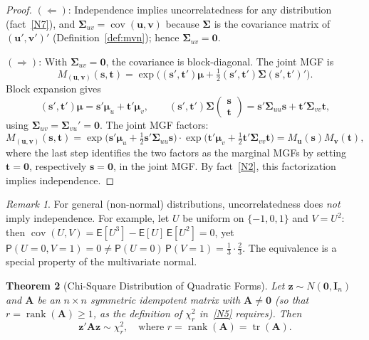 \documentclass[14pt]{extarticle}
\theoremstyle{plain}
\newtheorem{theorem}{Theorem}[section]
\theoremstyle{definition}
\theoremstyle{remark}
\newtheorem{remark}[theorem]{Remark}
\newcommand\expc{\mathsf{E}}
\newcommand\prb{\mathsf{P}}
\DeclareMathOperator\cov{cov}
\DeclareMathOperator\tr{tr}
\DeclareMathOperator\rank{rank}
\newcommand{\bI}{\mathbf{I}}
\newcommand{\bzero}{\mathbf{0}}
\newcommand{\bz}{\mathbf{z}}
\newcommand{\bA}{\mathbf{A}}
\newcommand{\bv}{\mathbf{v}}
\newcommand{\bu}{\mathbf{u}}
\begin{document}
\begin{proof}
$(\Leftarrow)$: Independence implies uncorrelatedness for any distribution (fact~\ref{N7}), and $\boldsymbol\Sigma_{uv} = \cov(\bu, \bv)$ because $\boldsymbol\Sigma$ is the covariance matrix of $(\bu', \bv')'$ (Definition~\ref{def:mvn}); hence $\boldsymbol\Sigma_{uv} = \bzero$.

$(\Rightarrow)$: With $\boldsymbol\Sigma_{uv} = \bzero$, the covariance is block-diagonal. The joint MGF is
\[
M_{(\bu,\bv)}(\mathbf{s}, \mathbf{t}) = \exp\bigl((\mathbf{s}', \mathbf{t}')\boldsymbol\mu + \tfrac{1}{2}(\mathbf{s}', \mathbf{t}')\boldsymbol\Sigma(\mathbf{s}', \mathbf{t}')'\bigr).
\]
Block expansion gives
\[
(\mathbf{s}', \mathbf{t}')\boldsymbol\mu = \mathbf{s}'\boldsymbol\mu_u + \mathbf{t}'\boldsymbol\mu_v, \qquad (\mathbf{s}', \mathbf{t}')\boldsymbol\Sigma\begin{pmatrix}\mathbf{s}\\\mathbf{t}\end{pmatrix} = \mathbf{s}'\boldsymbol\Sigma_{uu}\mathbf{s} + \mathbf{t}'\boldsymbol\Sigma_{vv}\mathbf{t},
\]
using $\boldsymbol\Sigma_{uv} = \boldsymbol\Sigma_{vu}' = \bzero$. The joint MGF factors:
\[
M_{(\bu,\bv)}(\mathbf{s}, \mathbf{t}) = \exp\bigl(\mathbf{s}'\boldsymbol\mu_u + \tfrac{1}{2}\mathbf{s}'\boldsymbol\Sigma_{uu}\mathbf{s}\bigr) \cdot \exp\bigl(\mathbf{t}'\boldsymbol\mu_v + \tfrac{1}{2}\mathbf{t}'\boldsymbol\Sigma_{vv}\mathbf{t}\bigr) = M_{\bu}(\mathbf{s}) M_{\bv}(\mathbf{t}),
\]
where the last step identifies the two factors as the marginal MGFs by setting $\mathbf{t} = \bzero$, respectively $\mathbf{s} = \bzero$, in the joint MGF. By fact~\ref{N2}, this factorization implies independence.
\end{proof}

\begin{remark}\label{rem:uncorr-indep}
For general (non-normal) distributions, uncorrelatedness does \emph{not} imply independence. For example, let $U$ be uniform on $\{-1, 0, 1\}$ and $V = U^2$: then $\cov(U, V) = \expc[U^3] - \expc[U]\,\expc[U^2] = 0$, yet $\prb(U = 0, V = 1) = 0 \neq \prb(U = 0)\,\prb(V = 1) = \tfrac{1}{3}\cdot\tfrac{2}{3}$. The equivalence is a special property of the multivariate normal.
\end{remark}

\begin{theorem}[Chi-Square Distribution of Quadratic Forms]\label{thm:quadratic-chisq}
Let $\bz \sim N(\bzero, \bI_n)$ and $\bA$ be an $n \times n$ symmetric idempotent matrix with $\bA \neq \bzero$ (so that $r = \rank(\bA) \geqslant 1$, as the definition of $\chi^2_r$ in~\ref{N5} requires). Then
\begin{equation}
\bz'\bA\bz \sim \chi^2_r, \quad \text{where } r = \rank(\bA) = \tr(\bA).
\end{equation}
\end{theorem}
\end{document}
